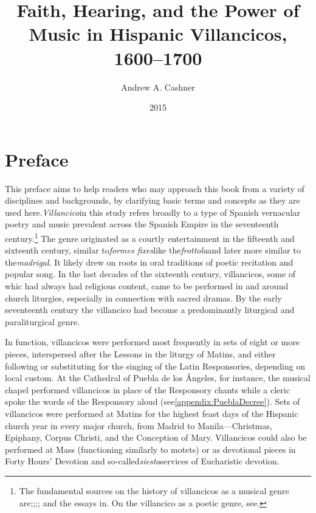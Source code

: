 \documentclass{memoir}
\begin{document}
\frontmatter

\begin{titlingpage}

\title{Faith, Hearing, and the Power of Music in Hispanic Villancicos, 1600–1700}

\author{Andrew A. Cashner}
\date{2015}

\maketitle
\end{titlingpage}
\tableofcontents*

\chapter{Preface}
\label{chapter:preface}

This preface aims to help readers who may approach this book from a variety of disciplines and backgrounds, by clarifying basic terms and concepts as they are used here.\emph{Villancico}in this study refers broadly to a type of Spanish vernacular poetry and music prevalent across the Spanish Empire in the seventeenth century.\footnote{The fundamental sources on the history of villancicos as a musical genre are\autocite{Laird1997};\autocite{Rubio1979};\autocite{Torrente1997};\autocite{Illari2001}; and the essays in\autocite{Knighton2007a}. On the villancico as a poetic genre, see\autocite{Tenorio1999}.}
The genre originated as a courtly entertainment in the fifteenth and sixteenth century, similar to\emph{formes fixes}like the\emph{frottola}and later more similar to the\emph{madrigal}. It likely drew on roots in oral traditions of poetic recitation and popular song. In the last decades of the sixteenth century, villancicos, some of whic had always had religious content, came to be performed in and around church liturgies, especially in connection with sacred dramas. By the early seventeenth century the villancico had become a predominantly liturgical and paraliturgical genre.

In function, villancicos were performed most frequently in sets of eight or more pieces, interspersed after the Lessons in the liturgy of Matins, and either following or substituting for the singing of the Latin Responsories, depending on local custom. At the Cathedral of Puebla de los Ángeles, for instance, the musical chapel performed villancicos in place of the Responsory chants while a cleric spoke the words of the Responsory aloud (see\ref{appendix:PueblaDecree}). Sets of villancicos were performed at Matins for the highest feast days of the Hispanic church year in every major church, from Madrid to Manila—Christmas, Epiphany, Corpus Christi, and the Conception of Mary. Villancicos could also be performed at Mass (functioning similarly to motets) or as devotional pieces in Forty Hours’ Devotion and so-called\emph{siesta}services of Eucharistic devotion.
\end{document}
